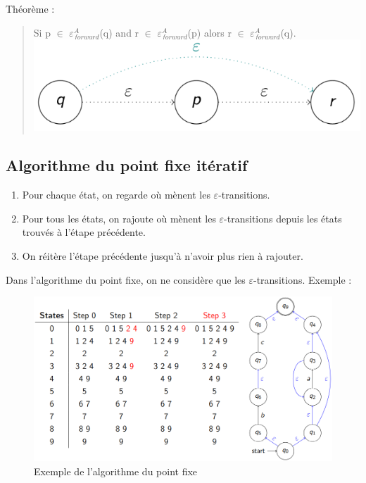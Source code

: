 \documentclass{article}
\begin{document}
Théorème :
\begin{quote}
    Si p $\in$ $\varepsilon_{forward}^{A}$(q) and r $\in$ $\varepsilon_{forward}^{A}$(p) alors r $\in$ $\varepsilon_{forward}^{A}$(q).\newline
    \includegraphics[scale=0.3]{Image11.png}
\end{quote}
\newpage
\subsection{Algorithme du point fixe itératif}
\begin{enumerate}
    \item Pour chaque état, on regarde où mènent les $\varepsilon$-transitions.
    \item Pour tous les états, on rajoute où mènent les $\varepsilon$-transitions depuis les états trouvés à l'étape précédente.
    \item On réitère l'étape précédente jusqu'à n'avoir plus rien à rajouter.
\end{enumerate}
Dans l'algorithme du point fixe, on ne considère que les $\varepsilon$-transitions.\newline
Exemple :
\begin{figure}[h]
    \centering
    \includegraphics[scale=0.4]{point_fixe.png}
    \caption{Exemple de l'algorithme du point fixe}
\end{figure}

\newpage
\end{document}
